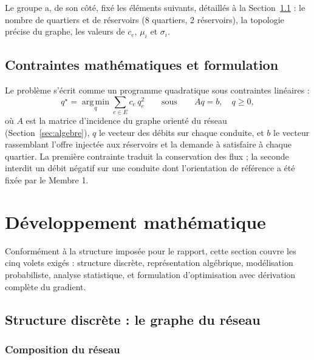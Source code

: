 \documentclass[11pt]{ama-article}
\begin{document}
Le groupe a, de son côté, fixé les éléments suivants, détaillés à la Section~\ref{sec:graphe} :
le nombre de quartiers et de réservoirs (8 quartiers, 2 réservoirs), la topologie précise du
graphe, les valeurs de $c_e$, $\mu_i$ et $\sigma_i$.

\subsection{Contraintes mathématiques et formulation}
\label{sec:formulation-math}

Le problème s'écrit comme un programme quadratique sous contraintes linéaires :
\begin{equation}
q^\star = \operatorname*{arg\,min}_{q} \sum_{e\in E} c_e\, q_e^2
\qquad \text{sous} \qquad Aq = b, \quad q \ge 0,
\label{eq:probleme-original}
\end{equation}
où $A$ est la matrice d'incidence du graphe orienté du réseau (Section~\ref{sec:algebre}), $q$
le vecteur des débits sur chaque conduite, et $b$ le vecteur rassemblant l'offre injectée aux
réservoirs et la demande à satisfaire à chaque quartier. La première contrainte traduit la
conservation des flux ; la seconde interdit un débit négatif sur une conduite dont
l'orientation de référence a été fixée par le Membre 1.

\section{Développement mathématique}

Conformément à la structure imposée pour le rapport, cette section couvre les cinq volets
exigés : structure discrète, représentation algébrique, modélisation probabiliste, analyse
statistique, et formulation d'optimisation avec dérivation complète du gradient.

\subsection{Structure discrète : le graphe du réseau}
\label{sec:graphe}

\subsubsection{Composition du réseau}
\end{document}
